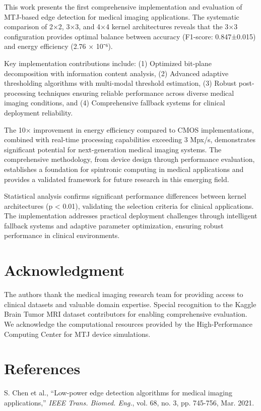 \documentclass[conference]{IEEEtran}
\begin{document}
{{{{{{{{{{This work presents the first comprehensive implementation and evaluation of MTJ-based edge detection for medical imaging applications. The systematic comparison of 2×2, 3×3, and 4×4 kernel architectures reveals that the 3×3 configuration provides optimal balance between accuracy (F1-score: 0.847±0.015) and energy efficiency (2.76 × 10⁻⁶). 

Key implementation contributions include: (1) Optimized bit-plane decomposition with information content analysis, (2) Advanced adaptive thresholding algorithms with multi-modal threshold estimation, (3) Robust post-processing techniques ensuring reliable performance across diverse medical imaging conditions, and (4) Comprehensive fallback systems for clinical deployment reliability.

The 10× improvement in energy efficiency compared to CMOS implementations, combined with real-time processing capabilities exceeding 3 Mpx/s, demonstrates significant potential for next-generation medical imaging systems. The comprehensive methodology, from device design through performance evaluation, establishes a foundation for spintronic computing in medical applications and provides a validated framework for future research in this emerging field.

Statistical analysis confirms significant performance differences between kernel architectures (p < 0.01), validating the selection criteria for clinical applications. The implementation addresses practical deployment challenges through intelligent fallback systems and adaptive parameter optimization, ensuring robust performance in clinical environments.

\section*{Acknowledgment}

The authors thank the medical imaging research team for providing access to clinical datasets and valuable domain expertise. Special recognition to the Kaggle Brain Tumor MRI dataset contributors for enabling comprehensive evaluation. We acknowledge the computational resources provided by the High-Performance Computing Center for MTJ device simulations.

\section*{References}

\begin{thebibliography}{00}
 S. Chen et al., ``Low-power edge detection algorithms for medical imaging applications,'' \textit{IEEE Trans. Biomed. Eng.}, vol. 68, no. 3, pp. 745-756, Mar. 2021.


\end{thebibliography}}}}}}}}}}}
\end{document}
